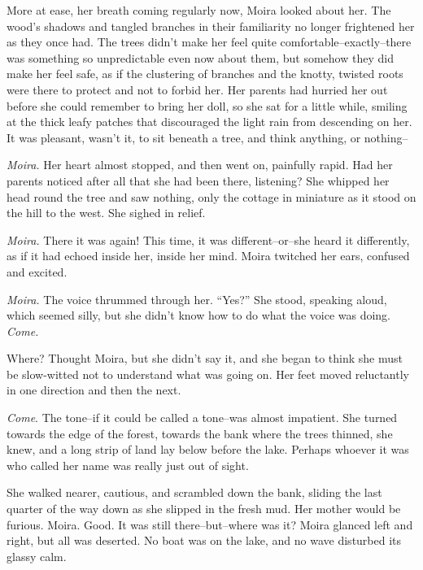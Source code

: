 \documentclass[letterpaper, twoside, 12pt]{memoir}
\begin{document}
More at ease, her breath coming regularly now, Moira looked about her. The wood’s shadows and tangled branches in their familiarity no longer frightened her as they once had. The trees didn’t make her feel quite comfortable--exactly--there was something so unpredictable even now about them, but somehow they did make her feel safe, as if the clustering of branches and the knotty, twisted roots were there to protect and not to forbid her.
Her parents had hurried her out before she could remember to bring her doll, so she sat for a little while, smiling at the thick leafy patches that discouraged the light rain from descending on her. It was pleasant, wasn’t it, to sit beneath a tree, and think anything, or nothing--

\textit{Moira.}
Her heart almost stopped, and then went on, painfully rapid. Had her parents noticed after all that she had been there, listening? She whipped her head round the tree and saw nothing, only the cottage in miniature as it stood on the hill to the west. She sighed in relief.

\textit{Moira.}
There it was again! This time, it was different--or--she heard it differently, as if it had echoed inside her, inside her mind. Moira twitched her ears, confused and excited.

\textit{Moira.} The voice thrummed through her.
“Yes?” She stood, speaking aloud, which seemed silly, but she didn’t know how to do what the voice was doing.
\textit{Come.}

Where? Thought Moira, but she didn’t say it, and she began to think she must be slow-witted not to understand what was going on. Her feet moved reluctantly in one direction and then the next.

\textit{Come}. The tone--if it could be called a tone--was almost impatient.
She turned towards the edge of the forest, towards the bank where the trees thinned, she knew, and a long strip of land lay below before the lake. Perhaps whoever it was who called her name was really just out of sight.

She walked nearer, cautious, and scrambled down the bank, sliding the last quarter of the way down as she slipped in the fresh mud. Her mother would be furious.
Moira.
Good. It was still there--but--where was it? Moira glanced left and right, but all was deserted. No boat was on the lake, and no wave disturbed its glassy calm.
\end{document}
